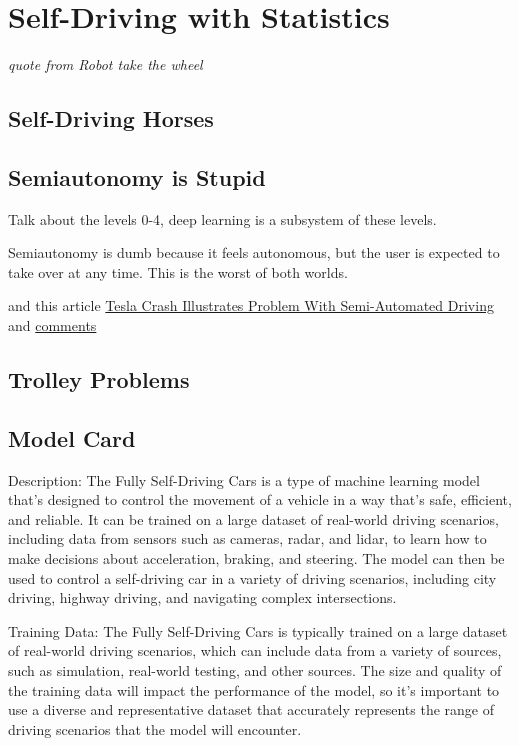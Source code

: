 \setchapterpreamble[u]{\margintoc}
\chapter{Self-Driving with Statistics}

\textit{quote from Robot take the wheel}

\section{Self-Driving Horses}

\section{Semiautonomy is Stupid}

Talk about the levels 0-4, deep learning is a subsystem of these levels.

Semiautonomy is dumb because it feels autonomous, but the user is expected to take over at any time. This is the worst of both worlds. \cite{torchinsky_boeckmann_2019}

and this article \href{https://www.theautopian.com/newly-released-video-of-thanksgiving-day-tesla-full-self-driving-crash-demonstrates-the-fundamental-problem-of-semi-automated-driving-systems/}{Tesla Crash Illustrates Problem With Semi-Automated Driving} and \href{https://news.ycombinator.com/item?id=34347778}{comments}

\section{Trolley Problems}

\section{Model Card}

Description:
The Fully Self-Driving Cars is a type of machine learning model that's designed to control the movement of a vehicle in a way that's safe, efficient, and reliable. It can be trained on a large dataset of real-world driving scenarios, including data from sensors such as cameras, radar, and lidar, to learn how to make decisions about acceleration, braking, and steering. The model can then be used to control a self-driving car in a variety of driving scenarios, including city driving, highway driving, and navigating complex intersections.

Training Data:
The Fully Self-Driving Cars is typically trained on a large dataset of real-world driving scenarios, which can include data from a variety of sources, such as simulation, real-world testing, and other sources. The size and quality of the training data will impact the performance of the model, so it's important to use a diverse and representative dataset that accurately represents the range of driving scenarios that the model will encounter.

